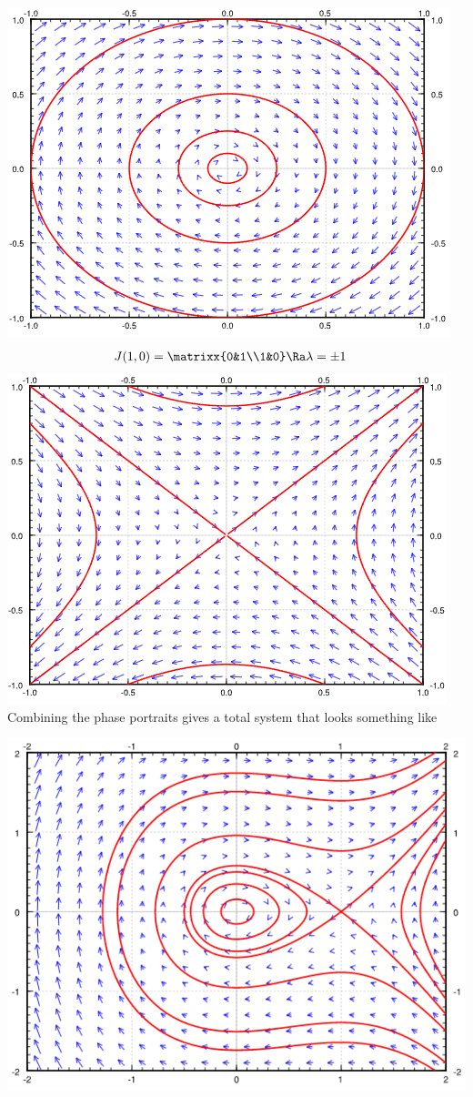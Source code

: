\includegraphics[scale=0.8]{Images/ODEPictures/phasePortrait6.png}
\begin{align*}
    &J(1,0)=\matrixx{0&1\\1&0}\Ra \lambda=\pm 1
\end{align*}
\includegraphics[scale=0.8]{Images/ODEPictures/phasePortrait7.png}\\
Combining the phase portraits gives a total system that looks something like\\
\centerline{\includegraphics[scale=0.9]{Images/ODEPictures/phasePortrait8.png}}
